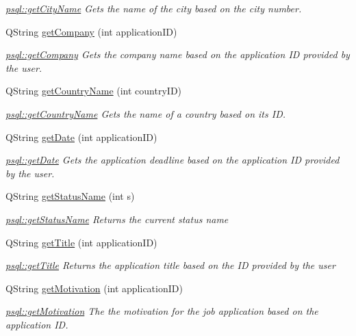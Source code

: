 \begin{DoxyCompactItemize}
\begin{DoxyCompactList}\small\item\em \mbox{\hyperlink{classpsql_a7acc18034ef60c8a1e69b0e1a15d8ab2}{psql\+::get\+City\+Name}} Gets the name of the city based on the city number. \end{DoxyCompactList}\item 
Q\+String \mbox{\hyperlink{classpsql_a09745cd03f09ffb2dacacaab4281915f}{get\+Company}} (int application\+ID)
\begin{DoxyCompactList}\small\item\em \mbox{\hyperlink{classpsql_a09745cd03f09ffb2dacacaab4281915f}{psql\+::get\+Company}} Gets the company name based on the application ID provided by the user. \end{DoxyCompactList}\item 
Q\+String \mbox{\hyperlink{classpsql_a5724e9992e6a5c98524ab73b98f4202d}{get\+Country\+Name}} (int country\+ID)
\begin{DoxyCompactList}\small\item\em \mbox{\hyperlink{classpsql_a5724e9992e6a5c98524ab73b98f4202d}{psql\+::get\+Country\+Name}} Gets the name of a country based on its ID. \end{DoxyCompactList}\item 
Q\+String \mbox{\hyperlink{classpsql_a561f96bfe7e9d092077712dd6b186af8}{get\+Date}} (int application\+ID)
\begin{DoxyCompactList}\small\item\em \mbox{\hyperlink{classpsql_a561f96bfe7e9d092077712dd6b186af8}{psql\+::get\+Date}} Gets the application deadline based on the application ID provided by the user. \end{DoxyCompactList}\item 
Q\+String \mbox{\hyperlink{classpsql_a5c2a64419a68a258071fd1f9a37c7c09}{get\+Status\+Name}} (int s)
\begin{DoxyCompactList}\small\item\em \mbox{\hyperlink{classpsql_a5c2a64419a68a258071fd1f9a37c7c09}{psql\+::get\+Status\+Name}} Returns the current status name \end{DoxyCompactList}\item 
Q\+String \mbox{\hyperlink{classpsql_ada9e3be3e0866011edf53e30ec510afc}{get\+Title}} (int application\+ID)
\begin{DoxyCompactList}\small\item\em \mbox{\hyperlink{classpsql_ada9e3be3e0866011edf53e30ec510afc}{psql\+::get\+Title}} Returns the application title based on the ID provided by the user \end{DoxyCompactList}\item 
Q\+String \mbox{\hyperlink{classpsql_aca1b2273937491e113089c1547caf49b}{get\+Motivation}} (int application\+ID)
\begin{DoxyCompactList}\small\item\em \mbox{\hyperlink{classpsql_aca1b2273937491e113089c1547caf49b}{psql\+::get\+Motivation}} The the motivation for the job application based on the application ID. \end{DoxyCompactList}\end{DoxyCompactItemize}


